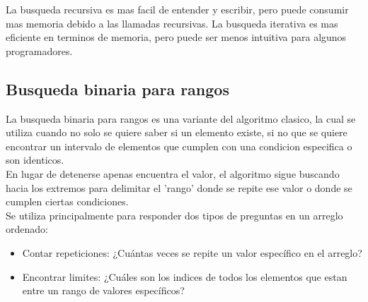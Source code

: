 \documentclass[9pt,letterpaper,onecolumn]{rho-class/rho}
\begin{document}
        \begin{info}
            La busqueda recursiva es mas facil de entender y escribir, pero puede consumir mas memoria debido a las llamadas recursivas.
            La busqueda iterativa es mas eficiente en terminos de memoria, pero puede ser menos intuitiva para algunos programadores.
        \end{info}

    \subsection{Busqueda binaria para rangos}
        La busqueda binaria para rangos es una variante del algoritmo clasico, la cual se utiliza cuando no solo se quiere saber si un elemento
        existe, si no que se quiere encontrar un intervalo de elementos que cumplen con una condicion especifica o son identicos.\\
        En lugar de detenerse apenas encuentra el valor, el algoritmo sigue buscando hacia los extremos para delimitar el 'rango' donde
        se repite ese valor o donde se cumplen ciertas condiciones.\\
        Se utiliza principalmente para responder dos tipos de preguntas en un arreglo ordenado:
        \begin{itemize}
            \item Contar repeticiones: ¿Cuántas veces se repite un valor específico en el arreglo?
            \item Encontrar limites: ¿Cuáles son los indices de todos los elementos que estan entre un rango de valores específicos?
        \end{itemize}
\end{document}
